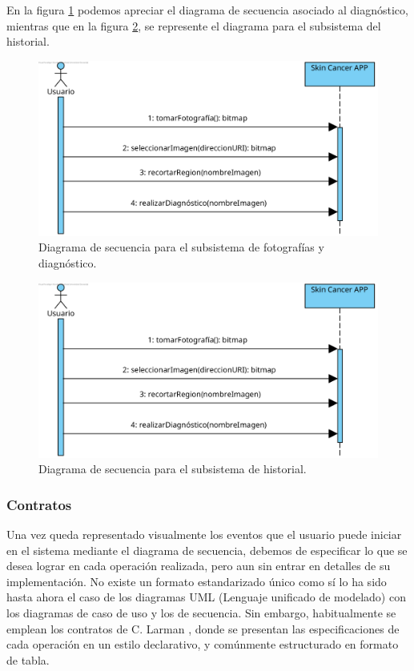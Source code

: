En la figura \ref{fig:secdiag} podemos apreciar el diagrama de secuencia asociado al diagnóstico, mientras que en la figura \ref{fig:sechistorial}, se represente el diagrama para el subsistema del historial.

\begin{figure}[H]
	\centering
	\includegraphics[scale = 1]{imagenes/DiagramaSecuenciaFotografia.png}
	\caption{Diagrama de secuencia para el subsistema de fotografías y diagnóstico.}
	\label{fig:secdiag}
\end{figure}

\begin{figure}[H]
	\centering
	\includegraphics[scale = 1]{imagenes/DiagramaSecuenciaFotografia.png}
	\caption{Diagrama de secuencia para el subsistema de historial.}
	\label{fig:sechistorial}
\end{figure}

 \subsubsection{Contratos}
 
 Una vez queda representado visualmente los eventos que el usuario puede iniciar en el sistema mediante el diagrama de secuencia, debemos	de especificar lo que se desea lograr en cada operación realizada, pero aun sin entrar en detalles de su implementación. No existe un formato estandarizado único como sí lo ha sido hasta ahora el caso de los diagramas UML (Lenguaje unificado de modelado) con los diagramas de caso de uso y los de secuencia. Sin embargo, habitualmente se emplean los contratos de C. Larman \cite{larman2003uml}, donde se presentan las especificaciones de cada operación en un estilo declarativo, y comúnmente estructurado en formato de tabla.
 
